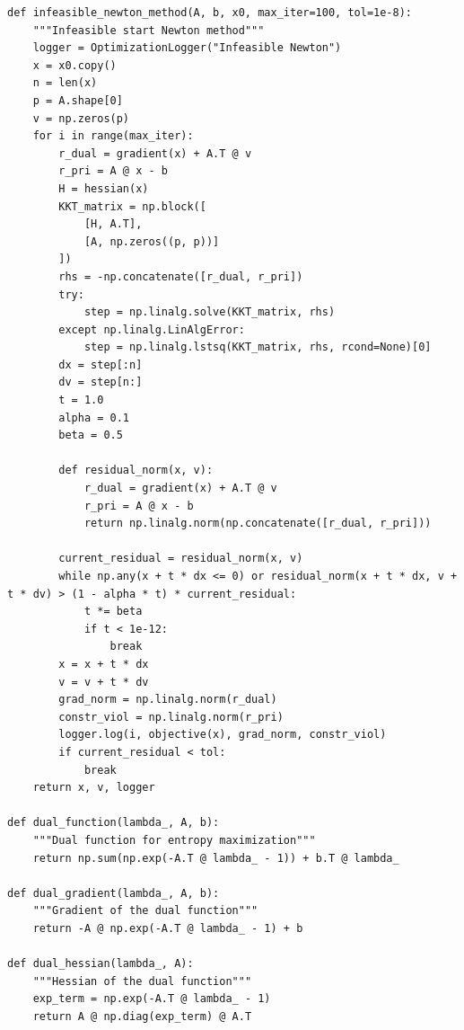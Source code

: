 \documentclass{article}
\newenvironment{solution_cn}{%
  \begin{proof}[解答]%
  \kaishu  %
}{%
  \end{proof}%
}
\begin{document}
\begin{solution_cn}
\begin{lstlisting}[caption={run.py}]
def infeasible_newton_method(A, b, x0, max_iter=100, tol=1e-8):
    """Infeasible start Newton method"""
    logger = OptimizationLogger("Infeasible Newton")
    x = x0.copy()
    n = len(x)
    p = A.shape[0]
    v = np.zeros(p)
    for i in range(max_iter):
        r_dual = gradient(x) + A.T @ v
        r_pri = A @ x - b
        H = hessian(x)
        KKT_matrix = np.block([
            [H, A.T],
            [A, np.zeros((p, p))]
        ])
        rhs = -np.concatenate([r_dual, r_pri])
        try:
            step = np.linalg.solve(KKT_matrix, rhs)
        except np.linalg.LinAlgError:
            step = np.linalg.lstsq(KKT_matrix, rhs, rcond=None)[0]
        dx = step[:n]
        dv = step[n:]
        t = 1.0
        alpha = 0.1
        beta = 0.5
        
        def residual_norm(x, v):
            r_dual = gradient(x) + A.T @ v
            r_pri = A @ x - b
            return np.linalg.norm(np.concatenate([r_dual, r_pri]))
        
        current_residual = residual_norm(x, v)
        while np.any(x + t * dx <= 0) or residual_norm(x + t * dx, v + t * dv) > (1 - alpha * t) * current_residual:
            t *= beta
            if t < 1e-12:
                break
        x = x + t * dx
        v = v + t * dv
        grad_norm = np.linalg.norm(r_dual)
        constr_viol = np.linalg.norm(r_pri)
        logger.log(i, objective(x), grad_norm, constr_viol)
        if current_residual < tol:
            break
    return x, v, logger

def dual_function(lambda_, A, b):
    """Dual function for entropy maximization"""
    return np.sum(np.exp(-A.T @ lambda_ - 1)) + b.T @ lambda_

def dual_gradient(lambda_, A, b):
    """Gradient of the dual function"""
    return -A @ np.exp(-A.T @ lambda_ - 1) + b

def dual_hessian(lambda_, A):
    """Hessian of the dual function"""
    exp_term = np.exp(-A.T @ lambda_ - 1)
    return A @ np.diag(exp_term) @ A.T


\end{lstlisting}
\end{solution_cn}
\end{document}
